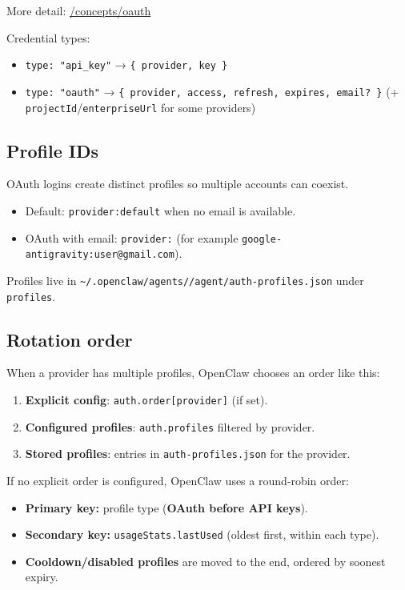 More detail: \href{/concepts/oauth}{/concepts/oauth}

Credential types:

\begin{itemize}
  \item \texttt{type: "api\_key"} → \texttt{\{ provider, key \}}
  \item \texttt{type: "oauth"} → \texttt{\{ provider, access, refresh, expires, email? \}} (+ \texttt{projectId}/\texttt{enterpriseUrl} for some providers)
\end{itemize}


\subsection{Profile IDs}


OAuth logins create distinct profiles so multiple accounts can coexist.

\begin{itemize}
  \item Default: \texttt{provider:default} when no email is available.
  \item OAuth with email: \texttt{provider:} (for example \texttt{google-antigravity:user@gmail.com}).
\end{itemize}


Profiles live in \texttt{\textasciitilde{}/.openclaw/agents//agent/auth-profiles.json} under \texttt{profiles}.

\subsection{Rotation order}


When a provider has multiple profiles, OpenClaw chooses an order like this:

\begin{enumerate}
  \item \textbf{Explicit config}: \texttt{auth.order[provider]} (if set).
  \item \textbf{Configured profiles}: \texttt{auth.profiles} filtered by provider.
  \item \textbf{Stored profiles}: entries in \texttt{auth-profiles.json} for the provider.
\end{enumerate}


If no explicit order is configured, OpenClaw uses a round‑robin order:

\begin{itemize}
  \item \textbf{Primary key:} profile type (\textbf{OAuth before API keys}).
  \item \textbf{Secondary key:} \texttt{usageStats.lastUsed} (oldest first, within each type).
  \item \textbf{Cooldown/disabled profiles} are moved to the end, ordered by soonest expiry.
\end{itemize}


